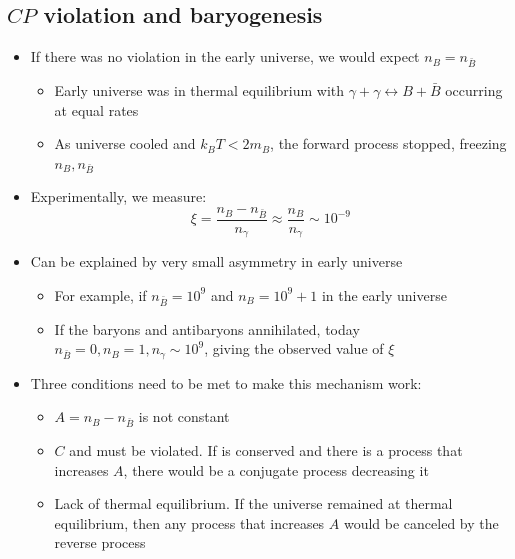 \subsection{$CP$ violation and baryogenesis}
\begin{itemize}
  \item If there was no \CP violation in the early universe, we would expect $n_B = n_{\bar{B}}$
  \begin{itemize}
    \item Early universe was in thermal equilibrium with $\gamma+\gamma \leftrightarrow B+\bar{B}$ occurring at equal rates
    \item As universe cooled and $k_BT< 2 m_B$, the forward process stopped, freezing $n_B,n_{\bar{B}}$
  \end{itemize}
  \item Experimentally, we measure:
  \begin{equation}
    \xi = \frac{n_B- n_{\bar{B}}}{n_\gamma} \approx \frac{n_B}{n_\gamma} \sim 10^{-9}
  \end{equation}
  \item Can be explained by very small asymmetry in early universe
  \begin{itemize}
    \item For example, if $n_{\bar{B}} = 10^9$ and $n_B = 10^9+1$ in the early universe
    \item If the baryons and antibaryons annihilated, today $n_{\bar{B}} = 0, n_B = 1, n_\gamma \sim 10^9$, giving the observed value of $\xi$
  \end{itemize}
  \item Three conditions need to be met to make this mechanism work:
  \begin{itemize}
    \item $A = n_B - n_{\bar{B}}$ is not constant
    \item $C$ and \CP must be violated. If \CP is conserved and there is a process that increases $A$, there would be a \CP conjugate process decreasing it
    \item Lack of thermal equilibrium. If the universe remained at thermal equilibrium, then any process that increases $A$ would be canceled by the reverse process
  \end{itemize}
\end{itemize}

